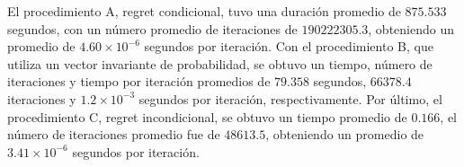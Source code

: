  El procedimiento A, regret condicional, tuvo una duración promedio de $875.533$ segundos, con un número promedio de iteraciones de $190222305.3$, obteniendo un promedio de $4.60 {\times} 10^{-6}$ segundos por iteración. Con el procedimiento B, que utiliza un vector invariante de probabilidad, se obtuvo un tiempo, número de iteraciones y tiempo por iteración promedios de $79.358$ segundos, $66378.4$ iteraciones y $1.2 {\times} 10^{-3}$ segundos por iteración, respectivamente. Por último, el procedimiento C, regret incondicional, se obtuvo un tiempo promedio de $0.166$, el número de iteraciones promedio fue de $48613.5$, obteniendo un promedio de $3.41 {\times} 10^{-6}$ segundos por iteración.
 
